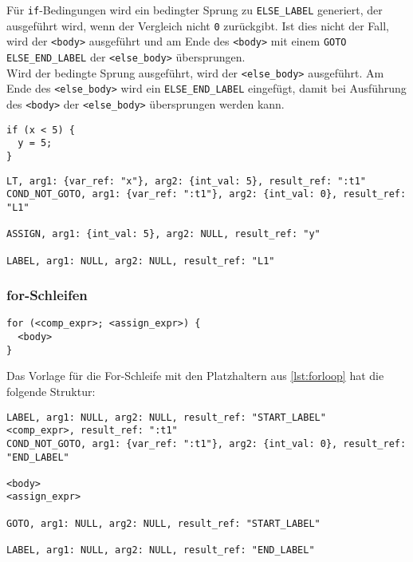 Für \texttt{if}-Bedingungen wird ein bedingter Sprung zu \texttt{ELSE\_LABEL} generiert, der ausgeführt wird, wenn der Vergleich nicht \texttt{0} zurückgibt.
Ist dies nicht der Fall, wird der \texttt{<body>} ausgeführt und am Ende des \texttt{<body>} mit einem \texttt{GOTO ELSE\_END\_LABEL}  der \texttt{<else\_body>} übersprungen.\\
Wird der bedingte Sprung ausgeführt, wird der \texttt{<else\_body>} ausgeführt.
Am Ende des \texttt{<else\_body>} wird ein \texttt{ELSE\_END\_LABEL} eingefügt, damit bei Ausführung des \texttt{<body>} der \texttt{<else\_body>} übersprungen werden kann.\\


\begin{lstlisting}[caption={Beispiel if-Bedingung}]
if (x < 5) {
  y = 5;
}
\end{lstlisting}

\begin{lstlisting}[caption={Drei-Adressen Code für die if-Bedingung}]
LT, arg1: {var_ref: "x"}, arg2: {int_val: 5}, result_ref: ":t1"
COND_NOT_GOTO, arg1: {var_ref: ":t1"}, arg2: {int_val: 0}, result_ref: "L1"

ASSIGN, arg1: {int_val: 5}, arg2: NULL, result_ref: "y"

LABEL, arg1: NULL, arg2: NULL, result_ref: "L1"
\end{lstlisting}

\subsubsection{for-Schleifen}

\begin{lstlisting}[caption={Beispielschleife}, label={lst:forloop}]
for (<comp_expr>; <assign_expr>) {
  <body>
}
\end{lstlisting}

Das Vorlage für die For-Schleife mit den Platzhaltern aus \autoref{lst:forloop} hat die folgende Struktur:

\begin{lstlisting}[caption={Drei-Adressen Code für for-Schleifen}]
LABEL, arg1: NULL, arg2: NULL, result_ref: "START_LABEL"
<comp_expr>, result_ref: ":t1"
COND_NOT_GOTO, arg1: {var_ref: ":t1"}, arg2: {int_val: 0}, result_ref: "END_LABEL"

<body>
<assign_expr>

GOTO, arg1: NULL, arg2: NULL, result_ref: "START_LABEL"

LABEL, arg1: NULL, arg2: NULL, result_ref: "END_LABEL"
\end{lstlisting}

